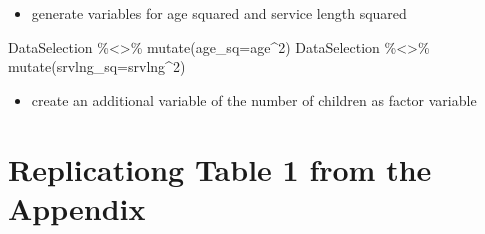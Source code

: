 \documentclass[
]{article}
\newenvironment{Shaded}{\begin{snugshade}}{\end{snugshade}}
\newcommand{\AttributeTok}[1]{\textcolor[rgb]{0.77,0.63,0.00}{#1}}
\newcommand{\DecValTok}[1]{\textcolor[rgb]{0.00,0.00,0.81}{#1}}
\newcommand{\FunctionTok}[1]{\textcolor[rgb]{0.00,0.00,0.00}{#1}}
\newcommand{\NormalTok}[1]{#1}
\newcommand{\SpecialCharTok}[1]{\textcolor[rgb]{0.00,0.00,0.00}{#1}}
\providecommand{\tightlist}{%
  \setlength{\itemsep}{0pt}\setlength{\parskip}{0pt}}
\begin{document}
\begin{Shaded}
\end{Shaded}

\begin{itemize}
\tightlist
\item
  generate variables for age squared and service length squared
\end{itemize}

\begin{Shaded}
\begin{Highlighting}[]
\NormalTok{DataSelection }\SpecialCharTok{\%\textless{}\textgreater{}\%} \FunctionTok{mutate}\NormalTok{(}\AttributeTok{age\_sq=}\NormalTok{age}\SpecialCharTok{\^{}}\DecValTok{2}\NormalTok{)}
\NormalTok{DataSelection }\SpecialCharTok{\%\textless{}\textgreater{}\%} \FunctionTok{mutate}\NormalTok{(}\AttributeTok{srvlng\_sq=}\NormalTok{srvlng}\SpecialCharTok{\^{}}\DecValTok{2}\NormalTok{)}
\end{Highlighting}
\end{Shaded}

\begin{itemize}
\tightlist
\item
  create an additional variable of the number of children as factor
  variable
\end{itemize}

\begin{Shaded}
\end{Shaded}

\hypertarget{replicationg-table-1-from-the-appendix}{%
\section{Replicationg Table 1 from the
Appendix}\label{replicationg-table-1-from-the-appendix}}
\end{document}
